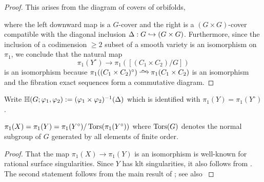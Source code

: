 \documentclass[main.tex]{subfiles}
\begin{document}
\begin{proof}
This arises from the diagram of \etale covers of orbifolds,
\begin{center}
\end{center}
where the left downward map is a $G$-cover and the right is a $(G \times G)$-cover compatible with the diagonal inclusion $\Delta : G \hookrightarrow (G \times G)$. Furthermore, since the inclusion of a codimension $\ge 2$ subset of a smooth variety is an isomorphism on $\pi_1$, we conclude that the natural map
\[ \pi_1(Y^{\circ}) \to \pi_1([(C_1 \times C_2) / G]) \]
is an isomorphism because $\pi_1((C_1 \times C_2)^{\circ}) \iso \pi_1(C_1 \times C_2)$ is an isomorphism and the fibration exact sequences form a commutative diagram.
\end{proof}

Write $\mathbb{H}(G;\varphi_1, \varphi_2) := (\varphi_1 \times \varphi_2)^{-1}(\Delta)$ which is identified with $\pi_1(Y) = \pi_1(Y^{\circ})$.

\begin{lemma} \label{lemma:fund_group_torsion}
$\pi_1(X) = \pi_1(Y) = \pi_1(Y^{\circ}) / \operatorname{\mathrm{Tors}}(\pi_1(Y^{\circ}))$ where $\operatorname{\mathrm{Tors}}(G)$ denotes the normal subgroup of $G$ generated by all elements of finite order.
\end{lemma}

\begin{proof}
That the map $\pi_1(X) \to \pi_1(Y)$ is an isomorphism is well-known for rational surface singularities. Since $Y$ has klt singularities, it also follows from \cite[Theorem 7.8]{kollar:shafarevich_maps}. The second statement follows from the main result of \cite{armstrong:orbit_space_1965, armstrong:orbit_space_1968}; see also \cite[Proposition 3.4]{bauer:fundamental_groups} 
\end{proof}
\end{document}
